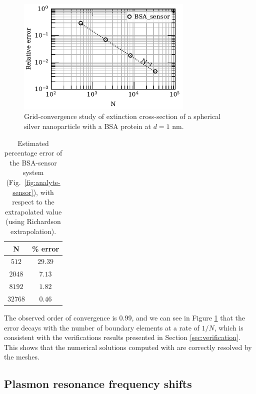 \begin{figure}[h] %
    \centering
    \includegraphics[width=0.75\textwidth]{convergence_bsa_sensor_R8_d1_w380.pdf} 
    \caption{Grid-convergence study of extinction cross-section of a spherical silver
             nanoparticle with a BSA protein at $d=1$ nm.}
    \label{fig:err_sph-bsa}
 \end{figure}

 \begin{table}[h]
    \centering
    \caption{\label{table:err_sph-bsa} Estimated percentage error of the BSA-sensor 
    system (Fig.~\ref{fig:analyte-sensor}), with respect to the extrapolated value 
    (using Richardson extrapolation).} 
    \begin{tabular}{c c}
    \hline%
    N & \% error \\
    \hline%
     $512$ & $29.39$ \\
     $2048$ & $7.13$ \\
     $8192$ & $1.82$ \\
     $32768$ & $0.46$ \\
    \hline%
    \end{tabular}
\end{table}

The observed order of convergence is 0.99, and we can see in Figure
\ref{fig:err_sph-bsa} that the error decays with the number of boundary elements
at a rate of $1/N$, which is consistent with the verifications results presented
in Section \ref{sec:verification}. This shows that the numerical solutions computed
with \pygbe are correctly resolved by the meshes.

\subsection{Plasmon resonance frequency shifts} \label{sec:shift_bsa}

